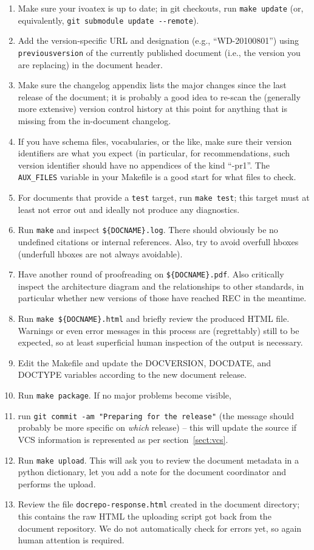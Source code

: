 \documentclass[11pt,a4paper]{ivoa}
\newcommand{\texword}[1]{\texttt{\color{texcolor} #1}}
\begin{document}
\begin{enumerate}
\item Make sure your ivoatex is up to date; in git checkouts, run
\verb|make update| (or, equivalently, 
\verb|git submodule update --remote|).
\item Add the version-specific URL and designation (e.g.,
``WD-20100801'') using \texword{previousversion} of the currently
published document (i.e., the version you are replacing) in the document
header.
\item Make sure the changelog appendix lists the major changes since the
last release of the document; it is probably a good idea to re-scan the
(generally more extensive) version control history at this point for
anything that is missing from the in-document changelog.
\item If you have schema files, vocabularies, or the like, make sure
their version identifiers are what you expect (in particular, for
recommendations, such version identifier should have no appendices
of the kind ``-pr1''.  The \verb|AUX_FILES| variable in your Makefile is
a good start for what files to check.
\item For documents that provide a \verb|test| target, run 
\verb|make test|; 
this target must at least not error out and ideally not produce
any diagnostics.
\item Run \verb|make| and inspect \verb|${DOCNAME}.log|.  There should
obviously be no undefined citations or internal references.  Also, try
to avoid overfull hboxes (underfull hboxes are not always avoidable).
\item Have another round of proofreading on \verb|${DOCNAME}.pdf|.  Also
critically inspect the architecture diagram and the relationships to
other standards, in particular whether new versions of those have
reached REC in the meantime.
\item Run \verb|make ${DOCNAME}.html| and briefly review the produced
HTML file.  Warnings or even error messages in this process are
(regrettably) still to be expected, so at least superficial human inspection 
of the output is necessary.
\item Edit the Makefile and update the DOCVERSION, DOCDATE, and DOCTYPE
variables according to the new document release.
\item Run \verb|make package|.  If no major problems become visible,
\item run \verb|git commit -am "Preparing for the release"| (the message
should probably be more specific on \textit{which} release) -- this
will update the source if VCS information is represented as per
section~\ref{sect:vcs}.
\item Run \verb|make upload|.  This will ask you to review the document
metadata in a python dictionary, let you add a note for the document
coordinator and performs the upload.
\item Review the file \texttt{docrepo-response.html} created in the
document directory; this contains the raw HTML the uploading script got
back from the document repository.  We do not automatically check for
errors yet, so again human attention is required.
\end{enumerate}
\end{document}
